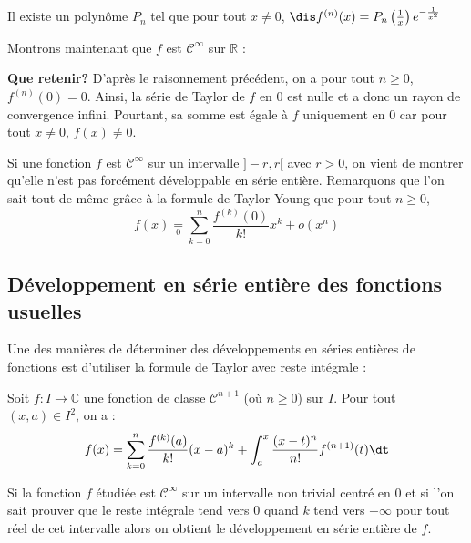 \documentclass[a4paper,10pt]{report}
\begin{document}
\begin{center}
\og Il existe un polynôme $P_n$ tel que pour tout $x \neq 0$, $\dis f^{(n)}(x) = P_n \left(\frac{1}{x} \right) e^{- \frac{1}{x^2}}$ \fg
\end{center}

\newpage

\phantom{test}

\vspace{7cm}

\noindent Montrons maintenant que $f$ est $\mathcal{C}^{\infty}$ sur $\mathbb{R}$ :

\vspace{7cm}

\noindent \textbf{Que retenir?} D'après le raisonnement précédent, on a pour tout $n \geq 0$, $f^{(n)}(0)=0$. Ainsi, la série de Taylor de $f$ en $0$ est nulle et a donc un rayon de convergence infini. Pourtant, sa somme est égale à $f$ uniquement en $0$ car pour tout $x \neq 0$, $f(x) \neq 0$.

\begin{rem} Si une fonction $f$ est $\mathcal{C}^{\infty}$ sur un intervalle $]-r,r[$ avec $r>0$, on vient de montrer qu'elle n'est pas forcément développable en série entière. Remarquons que l'on sait tout de même grâce à la formule de Taylor-Young que pour tout $n \geq 0$,
$$ f(x) \underset{0}{=} \sum_{k=0}^n \dfrac{f^{(k)}(0)}{k!}x^k + o(x^n)$$
\end{rem}
\subsection{Développement en série entière des fonctions usuelles}
\noindent Une des manières de déterminer des développements en séries entières de fonctions est d'utiliser la formule de Taylor avec reste intégrale :

\begin{thm} Soit $f : I \rightarrow \mathbb{C}$ une fonction de classe $\mathcal{C}^{n+1}$ (où $n \geq 0$) sur $I$. Pour tout $(x,a) \in I^2$, on a :
$$ f(x) = \sum_{k=0}^n \frac{f^{(k)}(a)}{k!}(x-a)^k + \int_{a}^x \frac{(x-t)^n}{n!} f^{(n+1)}(t) \dt$$
\end{thm}
\noindent Si la fonction $f$ étudiée est $\mathcal{C}^{\infty}$ sur un intervalle non trivial centré en $0$ et si l'on sait prouver que le reste intégrale tend vers $0$ quand $k$ tend vers $+ \infty$ pour tout réel de cet intervalle alors on obtient le développement en série entière de $f$.
\end{document}

